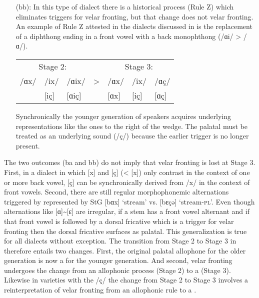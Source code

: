 \begin{itemize}
\item[(bb):] In this type of dialect there is a historical process (Rule Z) which eliminates triggers for velar fronting, but that change does not  velar fronting. An example of Rule Z attested in the dialects discussed in  is the replacement of a diphthong ending in a front vowel with a back monophthong (/ɑi/ > /ɑ/).

\ea%
    \label{ex:16:9}\begin{tabular}[t]{@{}lll c lll@{}}
    \multicolumn{3}{c}{Stage 2:}  &  & \multicolumn{3}{c}{Stage 3:}\\
     /ɑx/ & /ix/ & /ɑix/ & > &  /ɑx/&   /ix/ &  /ɑç/\\
 \relax    [ɑx] & [iç] & [ɑiç] &   & [ɑx] &  [iç]  & [ɑç] \\
    \end{tabular}
\z 

Synchronically the younger generation of speakers acquires underlying representations like the ones to the right of the wedge. The palatal must be treated as an underlying sound (/ç/) because the earlier trigger is no longer present.
\end{itemize}

The two  outcomes (ba and bb) do not imply that velar fronting is lost at Stage 3. First, in a dialect in which [x] and [ç] (< [x]) only contrast in the context of one or more back vowel, [ç] can be synchronically derived from /x/ in the context of front vowels. Second, there are still regular morphophonemic alternations triggered by  represented by StG [bɑx] ‘stream’ vs. [bɛçə] ‘stream-\textsc{pl}’. Even though  alternations like [ɑ]{\textasciitilde}[ɛ] are irregular, if a stem has a front vowel alternant and if that front vowel is followed by a dorsal fricative which is a trigger for velar fronting then the dorsal fricative surfaces as palatal. This generalization is true for all dialects without exception. The transition from Stage 2 to Stage 3 in  therefore entails two changes. First, the original palatal allophone for the older generation is now a  for the younger generation. And second, velar fronting undergoes the change from an allophonic process (Stage 2) to a  (Stage 3). Likewise in varieties with the  /ç/ the change from Stage 2 to Stage 3 involves a reinterpretation of velar fronting from an allophonic rule to a .

